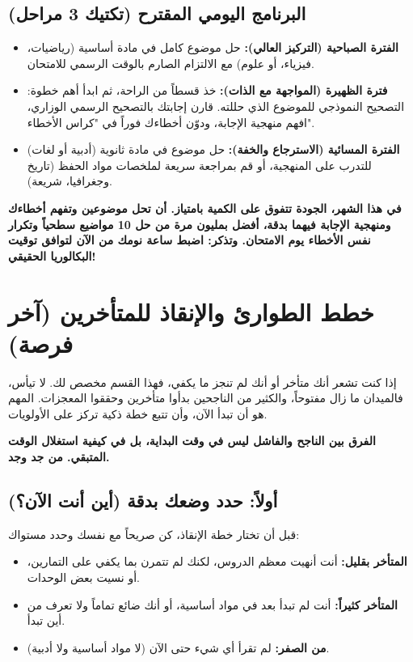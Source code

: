 \documentclass[12pt,a4paper]{book}
\newcommand{\importantAr}[1]{%
	\begin{important}
		\bfseries #1
	\end{important}
}
\begin{document}
	\subsection{البرنامج اليومي المقترح (تكتيك 3 مراحل)}
	\begin{itemize}
		\item \textbf{الفترة الصباحية (التركيز العالي):} حل موضوع كامل في مادة أساسية (رياضيات، فيزياء، أو علوم) مع الالتزام الصارم بالوقت الرسمي للامتحان.
		\item \textbf{فترة الظهيرة (المواجهة مع الذات):} خذ قسطاً من الراحة، ثم ابدأ أهم خطوة: التصحيح النموذجي للموضوع الذي حللته. قارن إجابتك بالتصحيح الرسمي الوزاري، افهم منهجية الإجابة، ودوّن أخطاءك فوراً في "كراس الأخطاء".
		\item \textbf{الفترة المسائية (الاسترجاع والخفة):} حل موضوع في مادة ثانوية (أدبية أو لغات) للتدرب على المنهجية، أو قم بمراجعة سريعة لملخصات مواد الحفظ (تاريخ وجغرافيا، شريعة).
	\end{itemize}
	
	\importantAr{في هذا الشهر، الجودة تتفوق على الكمية بامتياز. أن تحل موضوعين وتفهم أخطاءك ومنهجية الإجابة فيهما بدقة، أفضل بمليون مرة من حل 10 مواضيع سطحياً وتكرار نفس الأخطاء يوم الامتحان.  وتذكر: \newline اضبط ساعة نومك من الآن لتوافق توقيت البكالوريا الحقيقي!}
	
	\section{خطط الطوارئ والإنقاذ للمتأخرين (آخر فرصة)}
     \label{sec:psy-late-start-success}
	
	إذا كنت تشعر أنك متأخر أو أنك لم تنجز ما يكفي، فهذا القسم مخصص لك. لا تيأس، فالميدان ما زال مفتوحاً، والكثير من الناجحين بدأوا متأخرين وحققوا المعجزات. المهم هو أن تبدأ الآن، وأن تتبع خطة ذكية تركز على الأولويات.
	
	\importantAr{الفرق بين الناجح والفاشل ليس في وقت البداية، بل في كيفية استغلال الوقت المتبقي. من جد وجد.}
	
	\subsection{أولاً: حدد وضعك بدقة (أين أنت الآن؟)}
	قبل أن تختار خطة الإنقاذ، كن صريحاً مع نفسك وحدد مستواك:
	\begin{itemize}
		\item \textbf{المتأخر بقليل:} أنت أنهيت معظم الدروس، لكنك لم تتمرن بما يكفي على التمارين، أو نسيت بعض الوحدات.
		\item \textbf{المتأخر كثيراً:} أنت لم تبدأ بعد في مواد أساسية، أو أنك ضائع تماماً ولا تعرف من أين تبدأ.
		\item \textbf{من الصفر:} لم تقرأ أي شيء حتى الآن (لا مواد أساسية ولا أدبية).
	\end{itemize}
	
\end{document}
